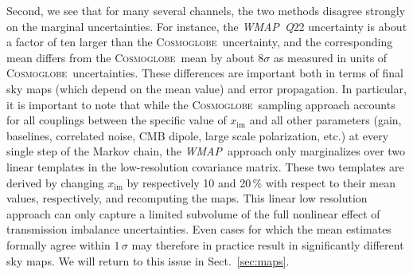 \documentclass[twocolumn]{../../common/aa}
\def\WMAP{\emph{WMAP}}
\newcommand{\cosmoglobe}{\textsc{Cosmoglobe}}
\newcommand{\Q}[0]{\textit Q}
\begin{document}
Second, we see that for many several channels, the two methods disagree strongly on the marginal uncertainties. For instance, the \WMAP\ \Q22 uncertainty is about a factor of ten larger than the \cosmoglobe\ uncertainty, and the corresponding mean differs from the \cosmoglobe\ mean by about $8\sigma$ as measured in units of \cosmoglobe\ uncertainties. These differences are important both in terms of final sky maps (which depend on the mean value) and error propagation. In particular, it is important to note that while the \cosmoglobe\ sampling approach accounts for all couplings between the specific value of $x_{\mathrm{im}}$ and all other parameters (gain, baselines, correlated noise, CMB dipole, large scale polarization, etc.) at every single step of the Markov chain, the \WMAP\ approach only marginalizes over two linear templates in the low-resolution covariance matrix. These two templates are derived by changing $x_{\mathrm{im}}$ by respectively 10 and 20\,\% with respect to their mean values, respectively, and recomputing the maps. This linear low resolution approach can only capture a limited subvolume of the full nonlinear effect of transmission imbalance uncertainties. Even cases for which the mean estimates formally agree within $1\,\sigma$ may therefore in practice result in significantly different sky maps. We will return to this issue in Sect.~\ref{sec:maps}. 
\end{document}
